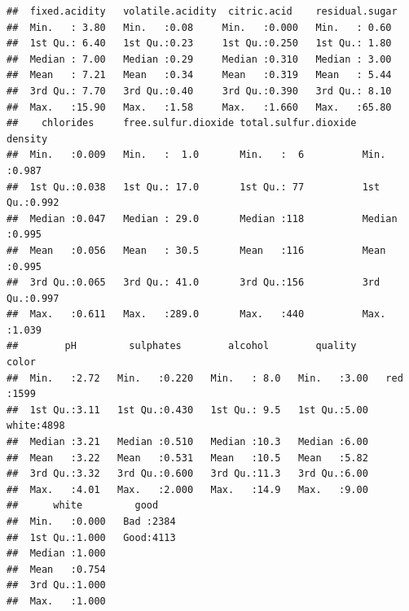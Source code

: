 \documentclass[english,nohyper,titlepage]{tufte-handout}\usepackage{knitr}
\begin{document}
\begin{knitrout}\footnotesize
{}\color{fgcolor}\begin{kframe}
\begin{alltt}
 \hlkwb{=} \hlstd{(}\hlstd{)}
\end{alltt}
\begin{verbatim}
##  fixed.acidity   volatile.acidity  citric.acid    residual.sugar 
##  Min.   : 3.80   Min.   :0.08     Min.   :0.000   Min.   : 0.60  
##  1st Qu.: 6.40   1st Qu.:0.23     1st Qu.:0.250   1st Qu.: 1.80  
##  Median : 7.00   Median :0.29     Median :0.310   Median : 3.00  
##  Mean   : 7.21   Mean   :0.34     Mean   :0.319   Mean   : 5.44  
##  3rd Qu.: 7.70   3rd Qu.:0.40     3rd Qu.:0.390   3rd Qu.: 8.10  
##  Max.   :15.90   Max.   :1.58     Max.   :1.660   Max.   :65.80  
##    chlorides     free.sulfur.dioxide total.sulfur.dioxide    density     
##  Min.   :0.009   Min.   :  1.0       Min.   :  6          Min.   :0.987  
##  1st Qu.:0.038   1st Qu.: 17.0       1st Qu.: 77          1st Qu.:0.992  
##  Median :0.047   Median : 29.0       Median :118          Median :0.995  
##  Mean   :0.056   Mean   : 30.5       Mean   :116          Mean   :0.995  
##  3rd Qu.:0.065   3rd Qu.: 41.0       3rd Qu.:156          3rd Qu.:0.997  
##  Max.   :0.611   Max.   :289.0       Max.   :440          Max.   :1.039  
##        pH         sulphates        alcohol        quality       color     
##  Min.   :2.72   Min.   :0.220   Min.   : 8.0   Min.   :3.00   red  :1599  
##  1st Qu.:3.11   1st Qu.:0.430   1st Qu.: 9.5   1st Qu.:5.00   white:4898  
##  Median :3.21   Median :0.510   Median :10.3   Median :6.00               
##  Mean   :3.22   Mean   :0.531   Mean   :10.5   Mean   :5.82               
##  3rd Qu.:3.32   3rd Qu.:0.600   3rd Qu.:11.3   3rd Qu.:6.00               
##  Max.   :4.01   Max.   :2.000   Max.   :14.9   Max.   :9.00               
##      white         good     
##  Min.   :0.000   Bad :2384  
##  1st Qu.:1.000   Good:4113  
##  Median :1.000              
##  Mean   :0.754              
##  3rd Qu.:1.000              
##  Max.   :1.000
\end{verbatim}
\end{kframe}
\end{knitrout}
\end{document}

